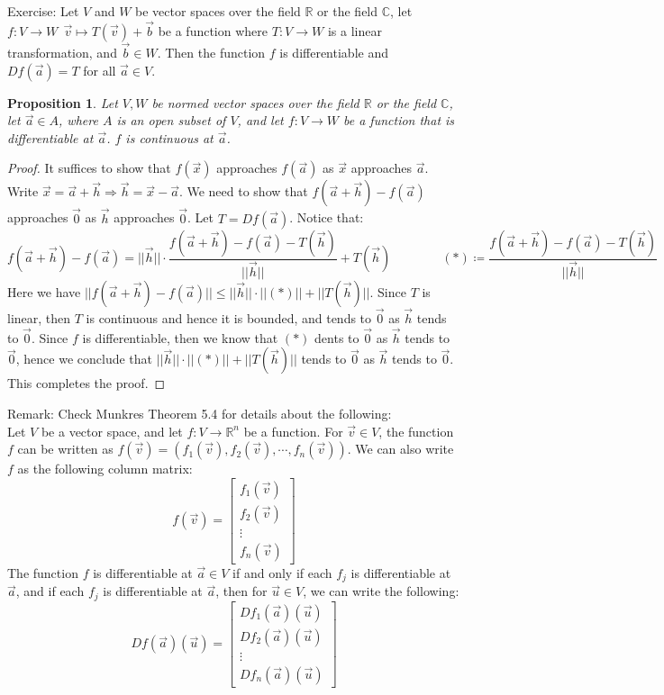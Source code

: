 \documentclass[11pt,oneside]{book}
\theoremstyle{break}
\theoremstyle{break}
\newtheorem{prop}[lem]{Proposition}
\newcommand{\R}{\mathbb{R}}
\newcommand{\Complex}{\mathbb{C}}
\newcommand{\remark}{\color{blue}Remark: \color{black}}
\newcommand{\exercise}{\color{green}Exercise: \color{black}}
\begin{document}
\exercise Let $V$ and $W$ be vector spaces over the field $\R$ or the field $\Complex$, let $f:V \to W \ \ \vec{v}\mapsto T(\vec{v})+\vec{b}$ be a function where $T:V\to W$ is a linear transformation, and $\vec{b}\in W$. Then the function $f$ is differentiable and $Df(\vec{a}) = T$ for all $\vec{a}\in V$.

\begin{prop}
Let $V,W$ be normed vector spaces over the field $\R$ or the field $\Complex$, let $\vec{a}\in A$, where $A$ is an open subset of $V$, and let $f:V \to W$ be a function that is differentiable at $\vec{a}$. $f$ is continuous at $\vec{a}$.
\end{prop}
\begin{proof}
It suffices to show that $f(\vec{x})$ approaches $f(\vec{a})$ as $\vec{x}$ approaches $\vec{a}$. Write $\vec{x} = \vec{a}+\vec{h} \Rightarrow \vec{h} = \vec{x}-\vec{a}$. We need to show that $f(\vec{a}+\vec{h}) - f(\vec{a})$ approaches $\vec{0}$ as $\vec{h}$ approaches $\vec{0}$. Let $T = Df(\vec{a})$.  Notice that: $$f(\vec{a}+\vec{h}) - f(\vec{a}) = ||\vec{h}||\cdot \frac{f(\vec{a}+\vec{h}) - f(\vec{a})-T(\vec{h})}{||\vec{h}||}+T(\vec{h})\qquad \qquad  (*)\coloneqq \frac{f(\vec{a}+\vec{h}) - f(\vec{a})-T(\vec{h})}{||\vec{h}||}$$ Here we have $||f(\vec{a}+\vec{h})-f(\vec{a})|| \leq ||\vec{h}||\cdot ||(*)||+||T(\vec{h})||$. Since $T$ is linear, then $T$ is continuous and hence it is bounded, and tends to $\vec{0}$ as $\vec{h}$ tends to $\vec{0}$. Since $f$ is differentiable, then we know that $(*)$ dents to $\vec{0}$ as $\vec{h}$ tends to $\vec{0}$, hence we conclude that $||\vec{h}||\cdot ||(*)||+||T(\vec{h})||$ tends to $\vec{0}$ as $\vec{h}$ tends to $\vec{0}$. This completes the proof.
\end{proof}
\newpage
\remark Check Munkres Theorem 5.4 for details about the following:\\
Let $V$ be a vector space, and let $f:V \to \R^n$ be a function. For $\vec{v}\in V$, the function $f$ can be written as $f(\vec{v}) = (f_1(\vec{v}),f_2(\vec{v}),\cdots, f_n(\vec{v}))$. We can also write $f$ as the following column matrix:
$$f(\vec{v})=\begin{bmatrix}
f_1(\vec{v})\\f_2(\vec{v})\\\vdots\\f_n(\vec{v})
\end{bmatrix}$$
The function $f$ is differentiable at $\vec{a}\in V$ if and only if each $f_j$ is differentiable at $\vec{a}$, and if each $f_j$ is differentiable at $\vec{a}$, then for $\vec{u} \in V$, we can write the following:
$$Df(\vec{a})(\vec{u}) = 
\begin{bmatrix}
Df_1(\vec{a})(\vec{u})\\Df_2(\vec{a})(\vec{u})\\\vdots \\Df_n(\vec{a})(\vec{u})
\end{bmatrix}
$$
\end{document}
